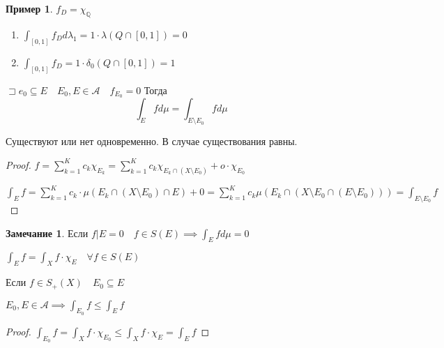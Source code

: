 \documentclass{book}
\newcommand\Q{\ensuremath{\mathbb{Q}}}
\theoremstyle{definition}
\newtheorem*{note}{Замечание}
\newtheorem*{example}{Пример}
\begin{document}
\begin{example}
    $f_D = \chi_{\Q}$

    \begin{enumerate}
        \item $\int_{[0,1]}f_Dd\lambda_1 = 1\cdot \lambda\left( Q\cap [0,1] \right)  = 0$
        \item $\int_{[0,1]}f_D = 1\cdot \delta_0\left( Q\cap [0,1] \right)  = 1$
    \end{enumerate}
\end{example}

\begin{statement}
    $\sqsupset e_0\subseteq E\quad E_0, E\in \mathcal A\quad f_{E_0} = 0$ Тогда \[\int_E fd\mu = \int_{E\setminus E_0} fd\mu \]

    Существуют или нет одновременно. В случае существования равны.
\end{statement}
\begin{proof}
    $f = \sum_{k=1}^{K} c_k\chi_{E_k} = \sum_{k=1}^{K} c_k \chi_{E_k\cap (X\setminus E_0)} + o \cdot \chi_{E_0}$ 

    $\int_Ef = \sum_{k=1}^{K} c_k\cdot \mu\left( E_k\cap \left( X\setminus E_0 \right) \cap E \right) + 0 = \sum_{k=1}^{K} c_k\mu\left( E_k\cap \left( X\setminus E_0 \cap \left( E\setminus E_0 \right)  \right)  \right) = \int_{E\setminus E_0}f$ 
\end{proof}

\begin{note}
    Если $f|E = 0\quad f\in S(E) \implies \int_Efd\mu = 0$
\end{note}

\begin{corollary}
    $\int_E f = \int_X f \cdot  \chi_{E}\quad \forall f\in S(E)$
\end{corollary}

\begin{corollary}

    Если $f\in S_+(X)\quad E_0\subseteq E$

$E_0, E\in \mathcal A \implies \int_{E_0}f \leqslant \int _E f$
\end{corollary}
\begin{proof}
    $\int_{E_0}f = \int_X f \cdot  \chi_{E_0} \leqslant \int_Xf\cdot \chi_E = \int_Ef$
\end{proof}
\end{document}

